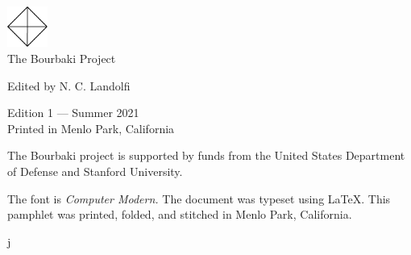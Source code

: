




\usepackage{tocloft}
\setlength{\cftsecnumwidth}{3em}



\begin{center}
  \includegraphics[width=0.1\textwidth]{../trademark}
  \\
  \vspace{0.5cm}
  \textsf{\Large The Bourbaki Project}

{\small \textsf{Edited by N. C. Landolfi}}
\end{center}

\vspace{\fill}

\begin{center}
  {\small \textsf{Edition 1 --- Summer 2021}} \\

  {\footnotesize \textsf{Printed in Menlo Park, California}}
\end{center}

\thispagestyle{empty}

% 
% 
\clearpage

\tableofcontents

\clearpage



\clearpage


The Bourbaki project is supported by funds from the United States Department of Defense and Stanford University.

\clearpage

\noindent\noindent The font is \textit{Computer Modern.}
The document was typeset using \LaTeX.
This pamphlet was printed, folded, and stitched in Menlo Park, California.


j